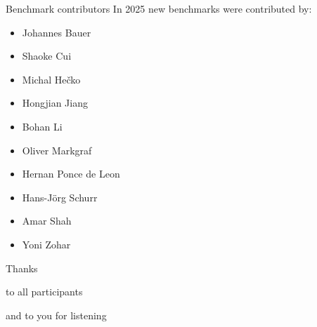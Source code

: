 \documentclass[table]{beamer}
\def\emph#1{\textcolor{MYblue}{#1}}
\begin{document}
\begin{frame}[shrink=0.95]{Benchmark contributors}
  In 2025 \emph{new benchmarks} were contributed by:

  \small
  \begin{itemize}
    \item Johannes Bauer  
    \item Shaoke Cui  
    \item Michal Hečko  
    \item Hongjian Jiang  
    \item Bohan Li  
    \item Oliver Markgraf  
    \item Hernan Ponce de Leon  
    \item Hans-Jörg Schurr  
    \item Amar Shah  
    \item Yoni Zohar  
  \end{itemize}
\end{frame}

\begin{frame}

  \begin{center}
    \Large\emph{Thanks}
  \end{center}

  \begin{center}
    to all participants
  \end{center}

  \bigskip
  \pause


  \begin{center}
    and to you for listening
  \end{center}

\end{frame}
\end{document}
